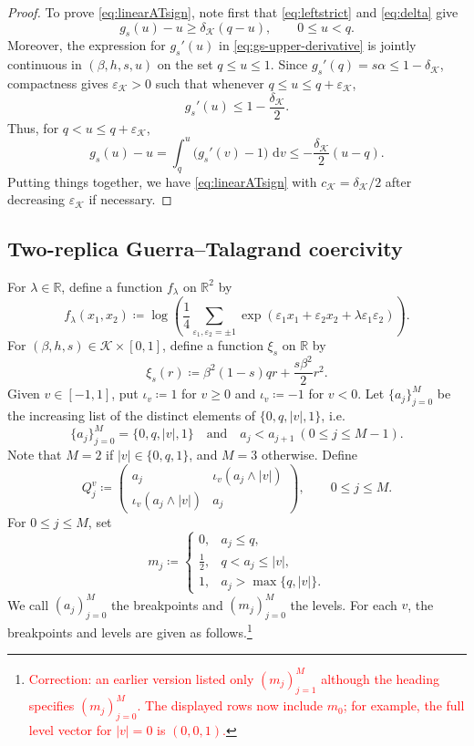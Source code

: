 \documentclass[11pt]{article}
\numberwithin{equation}{section}
\newcommand{\1}{\mathbf 1}
\newcommand{\cK}{\mathcal K}
\newcommand{\dd}{\,\mathrm d}
\begin{document}
\begin{proof}
To prove \eqref{eq:linearATsign}, note first that \eqref{eq:leftstrict} and
\eqref{eq:delta} give
\[
 g_s(u)-u\ge\delta_{\cK}(q-u),
 \qquad 0\le u<q.
\]
Moreover, the expression for $g_s'(u)$ in \eqref{eq:gs-upper-derivative}
is jointly continuous in $(\beta,h,s,u)$ on the set $q\le u\le1$.
Since $g_s'(q)=s\alpha\le1-\delta_{\cK}$, compactness gives
$\varepsilon_{\cK}>0$ such that $\text{whenever }q\le u\le q+\varepsilon_{\cK}$,
\[
 g_s'(u)\le1-\frac{\delta_{\cK}}2.
\]
Thus, for $q<u\le q+\varepsilon_{\cK}$,
\[
 g_s(u)-u
 =\int_q^u\bigl(g_s'(v)-1\bigr)\,\dd v
 \le-\frac{\delta_{\cK}}2(u-q).
\]
Putting things together, we have 
\eqref{eq:linearATsign} with $c_{\cK}=\delta_{\cK}/2$ after decreasing
$\varepsilon_{\cK}$ if necessary.
\end{proof}

\subsection{Two-replica Guerra--Talagrand coercivity}\label{subsec:GT}

For $\lambda\in\mathbb R$, define a function $f_\lambda$ on ${\mathbb R}^2$ by
\begin{equation}
 f_\lambda(x_1,x_2)
 \coloneqq\log\left(\frac14\sum_{\varepsilon_1,\varepsilon_2=\pm1}
 \exp(\varepsilon_1x_1+\varepsilon_2x_2
       +\lambda\varepsilon_1\varepsilon_2)\right).
 \label{eq:GTterminal}
\end{equation}
For $(\beta,h,s)\in\cK\times[0,1]$, define a function $\xi_s$ on ${\mathbb R}$ by
\begin{equation}
 \xi_s(r)\coloneqq\beta^2(1-s)qr+\frac{s\beta^2}{2}r^2.
\label{eq:xi}
\end{equation}
Given $v\in[-1,1]$, put $\iota_v\coloneqq1$ for $v\ge0$ and
$\iota_v\coloneqq-1$ for $v<0$.  Let $\{ a_j \}_{j=0}^{M}$ be the increasing list of the distinct elements of $\{0,q,|v|,1\}$, i.e.
\[
\{ a_j \}_{j=0}^{M}= \{0,q,|v|,1\} \quad \mbox{and} \quad a_j< a_{j+1} \ (0\le j \le M-1).
\]
Note that $M=2$ if $|v| \in \{0,q,1\}$, and $M=3$ otherwise.
Define
\begin{equation}
 Q_j^v\coloneqq
 \begin{pmatrix}
 a_j&\iota_v(a_j\wedge |v|)\\
 \iota_v(a_j\wedge |v|)&a_j
 \end{pmatrix},
 \qquad 0\le j\le M.
\end{equation}
For $0\le j\le M$, set
\begin{equation}
 m_j\coloneqq
 \begin{cases}
 0,&a_j\le q,\\[1mm]
 \frac12,&q<a_j\le |v|,\\[1mm]
 1,&a_j>\max\{q,|v|\}.
 \end{cases}
\end{equation}
We call $(a_j)_{j=0}^M$ the breakpoints and $(m_j)_{j=0}^{M}$ the levels.
For each $v$, the  breakpoints  and levels are given as follows.\footnote{\textcolor{red}{Correction: an earlier version listed only $(m_j)_{j=1}^M$ although the heading specifies $(m_j)_{j=0}^M$.  The displayed rows now include $m_0$; for example, the full level vector for $|v|=0$ is $(0,0,1)$.}}
\end{document}
